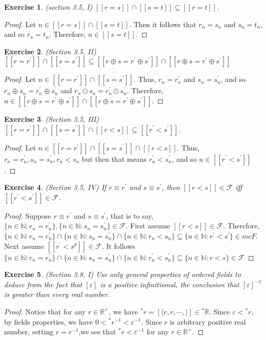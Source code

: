 \documentclass[a4paper, 11pt]{book}
\theoremstyle{plain}
\newtheorem{exercise}{Exercise}[chapter]
\theoremstyle{plain}
\newcommand{\mc}{\mathcal}
\newcommand{\N}{\mathbb{N}}
\newcommand{\R}{\mathbb{R}}
\newcommand{\la}{\langle}
\newcommand{\ra}{\rangle}
\newcommand{\op}{\oplus}
\newcommand{\od}{\odot}
\newcommand{\p}{\prime}
\newcommand{\ep}{\varepsilon}
\begin{document}
  \begin{exercise}
    (section 3.5, I)
    $[[r=s]] \cap [[s=t]] \subseteq [[r=t]]$.
  \end{exercise}
  \begin{proof}
    Let $n \in [[r=s]] \cap [[s=t]]$. Then it follows that $r_n=s_n$ and $s_n=t_n$, and so $r_n=t_n$. Therefore, $n \in [[s=t]]$.
  \end{proof}

  \begin{exercise} (Section 3.5, II)
    $[[r=r^\p]] \cap [[s=s^\p]] \subseteq [[r \op s=r^\p \op s^\p]] \cap [[r \op s=r^\p \op s^\p]]$
  \end{exercise}
  \begin{proof}
    Let $n \in [[r=r^\p]] \cap [[s=s^\p]]$. Thus, $r_n=r_n^\p$ and $s_n=s_n^\p$, and so $r_n \op s_n=r_n^\p \op s_n^\p$ and $r_n \od s_n = r_n^\p \od s_n^\p$. Therefore, $n \in [[r \op s=r^\p \op s^\p]] \cap [[r \op s=r^\p \op s^\p]]$.
  \end{proof}
  \begin{exercise}
    (Section 3.5, III)
    $[[r=r^\p]] \cap [[s=s^\p]] \cap [[r<s]] \subseteq [[r^\p<s^\p]]$.
  \end{exercise}
  \begin{proof}
    Let $n \in [[r=r^\p]] \cap [[s=s^\p]] \cap [[r<s]]$. Thus, $r_n=r_n^\p, s_n=s_n^\p, r_n<s_n$ but then that means $r_n^\p<s_n^\p$, and so $ n \in [[r^\p<s^\p]]$.
  \end{proof}
  \begin{exercise} (Section 3.5, IV)
    If $r \equiv r^\p$ and $s \equiv s^\p$, then $[[r<s]] \in \mc{F}$ iff $[[r^\p<s^\p]] \in \mc{F}$.
  \end{exercise}
  \begin{proof}
    Suppose $r \equiv r^\p$ and $s \equiv s^\p$, that is to say, $\{n \in \N: r_n=r_n^\p\}, \{n \in \N: s_n=s_n^\p\} \in \mc{F}$. First assume $[[r<s]] \in \mc{F}$. Therefore, $\{n \in \N: r_n=r_n^\p\} \cap \{n \in \N: s_n=s_n^\p\} \cap \{n \in \N: r_n<s_n\} \subseteq \{n \in \N: r^\p<s^\p \} \in mc{F}$. Next assume $[[r^\p<s^p]] \in \mc{F}$. It follows $\{n \in \N: r_n=r_n^\p\} \cap \{n \in \N: s_n=s_n^\p\} \cap \{n \in \N: r_n^\p<s_n^\p\} \subseteq \{n \in \N: r<s\} \in \mc{F}$
  \end{proof}

  \begin{exercise}
    (Section 3.8, I)
    Use only general properties of ordered fields to deduce from the fact that $[\ep]$ is a positive infinitismal, the conclusion that $[\ep]^{-1}$ is greater than every real number.
  \end{exercise}
  \begin{proof}
    Notice that for any $r \in \R^+$, we have ${}^* r=[\la r,r,\cdots,\ra] \in {}^* \R$. Since $\ep<{}^* r$, by fields properties, we have $0<{}^* r^{-1}<\ep^{-1}$. Since $r$ is arbitrary positive real number, setting $r=r^{-1}$,we see that ${}^* r< \ep^{-1}$ for any $r \in \R^+$. 
  \end{proof}
  
\end{document}

